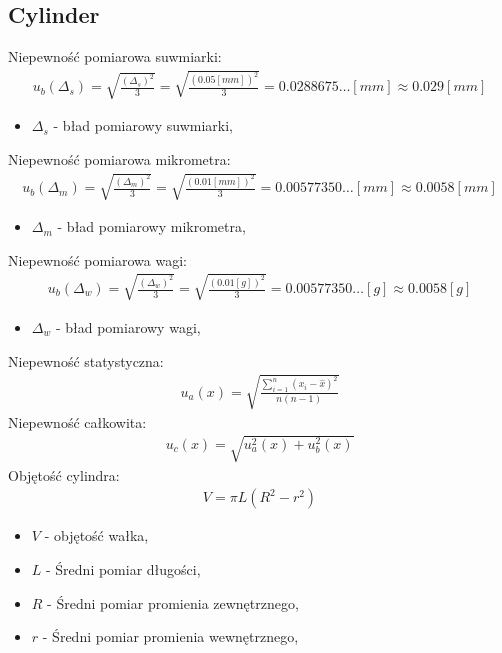 \documentclass[11pt]{article}
\begin{document}
    \subsection{Cylinder}
    \noindent Niepewność pomiarowa suwmiarki:
    \begin{gather*}
        u_b(\Delta_s)=\sqrt{\frac{(\Delta_s)^2}{3}}=\sqrt{\frac{(0.05[mm])^2}{3}}=0.0288675\dots[mm]\approx 0.029[mm]
    \end{gather*}
    {\footnotesize
        \begin{itemize}
            \item[] $\Delta_s$ - bład pomiarowy suwmiarki,
        \end{itemize}}
    \noindent Niepewność pomiarowa mikrometra:
    \begin{gather*}
        u_b(\Delta_m)=\sqrt{\frac{(\Delta_m)^2}{3}}=\sqrt{\frac{(0.01[mm])^2}{3}}=0.00577350\dots[mm]\approx 0.0058[mm]
    \end{gather*}
    {\footnotesize
        \begin{itemize}
            \item[] $\Delta_m$ - bład pomiarowy mikrometra,
        \end{itemize}}
    \noindent Niepewność pomiarowa wagi:
    \begin{gather*}
        u_b(\Delta_w)=\sqrt{\frac{(\Delta_w)^2}{3}}=\sqrt{\frac{(0.01[g])^2}{3}}=0.00577350\dots[g]\approx 0.0058[g]
    \end{gather*}
    {\footnotesize
        \begin{itemize}
            \item[] $\Delta_w$ - bład pomiarowy wagi,
        \end{itemize}}
    \noindent Niepewność statystyczna:
    \begin{gather*}
        u_a(x)=\sqrt{\frac{\sum_{i=1}^n(x_i-\hat{x})^2}{n(n-1)}}
    \end{gather*}
    \noindent Niepewność całkowita:
    \begin{gather*}
        u_c(x)=\sqrt{u_a^2(x)+u_b^2(x)}
    \end{gather*}
    \noindent Objętość cylindra:
    \begin{gather*}
        V = \pi L(R^2 -r^2)
    \end{gather*}
    {
        \begin{itemize}
            \setlength\itemsep{0.1em}
            \item[] $V$ - objętość wałka,
            \item[] $L$ - Średni pomiar długości,
            \item[] $R$ - Średni pomiar promienia zewnętrznego,
            \item[] $r$ - Średni pomiar promienia wewnętrznego,
        \end{itemize}
    }
\end{document}
